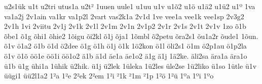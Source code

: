 {u2s1^^fck
u1t
u2tri
utus1a
u2t^^b2
1uuen
uule1
u1uu
u1v
u1^^f52
u1^^f6
u1^^e42
u1^^fc2
u1^^ba
1va
va1a2j
2v1ain
va1kr
va1p2l
2vart
vas2k1a
2v1d
1ve
vee1a
vee1k
vee1sp
2v3g2
2v1h
1vi
2viitu
2v1j
2v1k
2v1l
2v1m
2v1n
2v1p2
2v1r
2v1s
2v1t
2v1v
1zo
^^f51b
^^f5be1
^^f51g
^^f5hi1
^^f5hie2
1^^f5igu
^^f5i2kl
^^f51j
^^f5ja1
1^^f5mbl
^^f52petu
^^f5ra2s1
^^f5u1a2r
^^f5ude1
1^^f5un.
^^f51v
^^f61a2
^^f61b
^^f61d
^^f62dee
^^f61g
^^f61h
^^f61j
^^f61k
1^^f62kon
^^f61l
^^f6li2s1
^^f61m
^^f62p1au
^^f61p2la
^^f61v
^^f61^^f5
^^f6^^f61e
^^f6^^f61i
^^f6^^f61o2
^^e41b
^^e41d
^^e4e1a
^^e4e1o2
^^e41g
^^e41j
1^^e42ke.
^^e4li2sa
^^e4ra1a
^^e4ra1o
^^fc1b
^^fc1g
^^fchi1a
1^^fchik
^^fc2hik.
^^fc1j
^^fc2lek
1^^fcleka
1^^fc2les
^^fcle2se
1^^fc2liko
^^fc1so
1^^fctle
^^fc1v
^^fc^^fcgi1
^^fc^^fc2l1a2
1^^b2a
1^^b2e
2^^b2ek
2^^b2em
1^^b2i
^^b21k
^^b21m
^^b21p
1^^b2^^f6
1^^b2^^fc
1^^baa
1^^bai
1^^bao
}%
